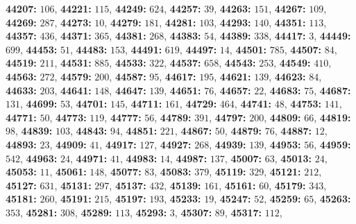 \textsf{\bfseries 44207:} $106$, \textsf{\bfseries 44221:} $115$, \textsf{\bfseries 44249:} $624$, \textsf{\bfseries 44257:} $39$, \textsf{\bfseries 44263:} $151$, \textsf{\bfseries 44267:} $109$, \textsf{\bfseries 44269:} $287$, \textsf{\bfseries 44273:} $10$, \textsf{\bfseries 44279:} $181$, \textsf{\bfseries 44281:} $103$, \textsf{\bfseries 44293:} $140$, \textsf{\bfseries 44351:} $113$, \textsf{\bfseries 44357:} $436$, \textsf{\bfseries 44371:} $365$, \textsf{\bfseries 44381:} $268$, \textsf{\bfseries 44383:} $54$, \textsf{\bfseries 44389:} $338$, \textsf{\bfseries 44417:} $3$, \textsf{\bfseries 44449:} $699$, \textsf{\bfseries 44453:} $51$, \textsf{\bfseries 44483:} $153$, \textsf{\bfseries 44491:} $619$, \textsf{\bfseries 44497:} $14$, \textsf{\bfseries 44501:} $785$, \textsf{\bfseries 44507:} $84$, \textsf{\bfseries 44519:} $211$, \textsf{\bfseries 44531:} $885$, \textsf{\bfseries 44533:} $322$, \textsf{\bfseries 44537:} $658$, \textsf{\bfseries 44543:} $253$, \textsf{\bfseries 44549:} $410$, \textsf{\bfseries 44563:} $272$, \textsf{\bfseries 44579:} $200$, \textsf{\bfseries 44587:} $95$, \textsf{\bfseries 44617:} $195$, \textsf{\bfseries 44621:} $139$, \textsf{\bfseries 44623:} $84$, \textsf{\bfseries 44633:} $203$, \textsf{\bfseries 44641:} $148$, \textsf{\bfseries 44647:} $139$, \textsf{\bfseries 44651:} $76$, \textsf{\bfseries 44657:} $22$, \textsf{\bfseries 44683:} $75$, \textsf{\bfseries 44687:} $131$, \textsf{\bfseries 44699:} $53$, \textsf{\bfseries 44701:} $145$, \textsf{\bfseries 44711:} $161$, \textsf{\bfseries 44729:} $464$, \textsf{\bfseries 44741:} $48$, \textsf{\bfseries 44753:} $141$, \textsf{\bfseries 44771:} $50$, \textsf{\bfseries 44773:} $119$, \textsf{\bfseries 44777:} $56$, \textsf{\bfseries 44789:} $391$, \textsf{\bfseries 44797:} $200$, \textsf{\bfseries 44809:} $66$, \textsf{\bfseries 44819:} $98$, \textsf{\bfseries 44839:} $103$, \textsf{\bfseries 44843:} $94$, \textsf{\bfseries 44851:} $221$, \textsf{\bfseries 44867:} $50$, \textsf{\bfseries 44879:} $76$, \textsf{\bfseries 44887:} $12$, \textsf{\bfseries 44893:} $23$, \textsf{\bfseries 44909:} $41$, \textsf{\bfseries 44917:} $127$, \textsf{\bfseries 44927:} $268$, \textsf{\bfseries 44939:} $139$, \textsf{\bfseries 44953:} $56$, \textsf{\bfseries 44959:} $542$, \textsf{\bfseries 44963:} $24$, \textsf{\bfseries 44971:} $41$, \textsf{\bfseries 44983:} $14$, \textsf{\bfseries 44987:} $137$, \textsf{\bfseries 45007:} $63$, \textsf{\bfseries 45013:} $24$, \textsf{\bfseries 45053:} $11$, \textsf{\bfseries 45061:} $148$, \textsf{\bfseries 45077:} $83$, \textsf{\bfseries 45083:} $379$, \textsf{\bfseries 45119:} $329$, \textsf{\bfseries 45121:} $212$, \textsf{\bfseries 45127:} $631$, \textsf{\bfseries 45131:} $297$, \textsf{\bfseries 45137:} $432$, \textsf{\bfseries 45139:} $161$, \textsf{\bfseries 45161:} $60$, \textsf{\bfseries 45179:} $343$, \textsf{\bfseries 45181:} $260$, \textsf{\bfseries 45191:} $215$, \textsf{\bfseries 45197:} $193$, \textsf{\bfseries 45233:} $19$, \textsf{\bfseries 45247:} $52$, \textsf{\bfseries 45259:} $65$, \textsf{\bfseries 45263:} $353$, \textsf{\bfseries 45281:} $308$, \textsf{\bfseries 45289:} $113$, \textsf{\bfseries 45293:} $3$, \textsf{\bfseries 45307:} $89$, \textsf{\bfseries 45317:} $112$, 
